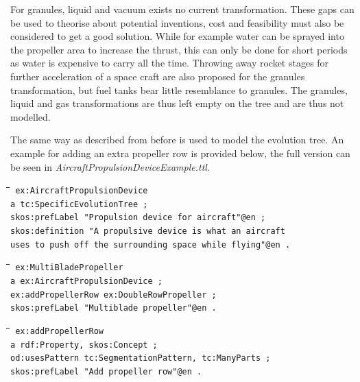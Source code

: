 \documentclass[11pt,a4paper]{article}
\newenvironment{code}{\tt \begin{tabbing}
\hskip12pt\=\hskip12pt\=\hskip12pt\=\hskip12pt\=\hskip5cm\=\hskip5cm\=\kill}
{\end{tabbing}}
\begin{document}
For granules, liquid and vacuum exists no current transformation. These gaps
can be used to theorise about potential inventions, cost and feasibility must
also be considered to get a good solution. While for example water can be
sprayed into the propeller area to increase the thrust, this can only be done
for short periods as water is expensive to carry all the time. Throwing away
rocket stages for further acceleration of a space craft are also proposed for
the granules transformation, but fuel tanks bear little resemblance to
granules. The granules, liquid and gas transformations are thus left empty on
the tree and are thus not modelled. 

The same way as described from before is used to model the evolution tree. An
example for adding an extra propeller row is provided below, the full version
can be seen in \textit{AircraftPropulsionDeviceExample.ttl}. 

\begin{code}\tt
ex:AircraftPropulsionDevice \\
\> a tc:SpecificEvolutionTree ; \\
\> skos:prefLabel "Propulsion device for aircraft"@en ; \\
\> skos:definition "A propulsive device is what an aircraft \\
\>\> uses to push off the surrounding space while flying"@en .
\end{code}
\begin{code}\tt
ex:MultiBladePropeller \\
\> a ex:AircraftPropulsionDevice ; \\
\> ex:addPropellerRow ex:DoubleRowPropeller ; \\
\> skos:prefLabel "Multiblade propeller"@en .
\end{code}
\begin{code}\tt
ex:addPropellerRow \\
\> a rdf:Property, skos:Concept ; \\
\> od:usesPattern tc:SegmentationPattern, tc:ManyParts ; \\
\> skos:prefLabel "Add propeller row"@en .
\end{code}
\end{document}
